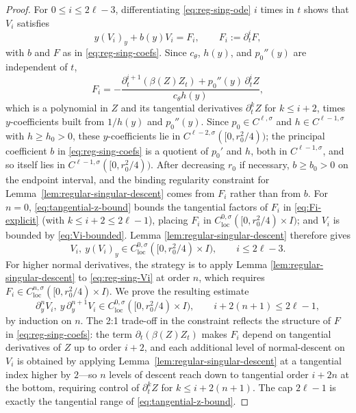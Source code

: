 \documentclass[10pt,a4paper]{amsart}
\newcommand{\loc}{\mathrm{loc}}
\begin{document}
\begin{proof}
For \(0\le i\le2\ell-3\), differentiating \eqref{eq:reg-sing-ode} \(i\)
times in \(t\) shows that \(V_i\) satisfies
\begin{equation}
\label{eq:reg-sing-Vi}
        y(V_i)_y+b(y)V_i=F_i,
        \qquad F_i:=\partial_t^iF,
\end{equation}
with \(b\) and \(F\) as in \eqref{eq:reg-sing-coefs}. Since
\(c_\theta\), \(h(y)\), and \(p_0''(y)\) are independent of \(t\),
\begin{equation}
\label{eq:Fi-explicit}
        F_i=-\frac{\partial_t^{i+1}(\beta(Z)Z_t)
        +p_0''(y)\,\partial_t^iZ}{c_\theta h(y)} ,
\end{equation}
which is a polynomial in \(Z\) and its tangential derivatives
\(\partial_t^kZ\) for \(k\le i+2\), times \(y\)-coefficients built from
\(1/h(y)\) and \(p_0''(y)\). Since \(p_0\in C^{\ell,\sigma}\) and
\(h\in C^{\ell-1,\sigma}\) with \(h\ge h_0>0\), these \(y\)-coefficients
lie in \(C^{\ell-2,\sigma}([0,r_0^2/4))\); the principal coefficient
\(b\) in \eqref{eq:reg-sing-coefs} is a quotient of \(p_0'\) and \(h\), both
in \(C^{\ell-1,\sigma}\), and so itself lies in
\(C^{\ell-1,\sigma}([0,r_0^2/4))\). After decreasing \(r_0\) if
necessary, \(b\ge b_0>0\) on the endpoint interval, and the binding
regularity constraint for
Lemma~\ref{lem:regular-singular-descent} comes from \(F_i\) rather than
from \(b\).
For \(n=0\), \eqref{eq:tangential-z-bound} bounds the tangential factors
of \(F_i\) in \eqref{eq:Fi-explicit} (with \(k\le i+2\le2\ell-1\)),
placing \(F_i\) in \(C^{0,\sigma}_{\loc}([0,r_0^2/4)\times I)\); and
\(V_i\) is bounded by \eqref{eq:Vi-bounded}. Lemma
\ref{lem:regular-singular-descent} therefore gives
\begin{equation}
\label{eq:Vi-base}
        V_i,\ y(V_i)_y\in C^{0,\sigma}_{\loc}([0,r_0^2/4)\times I),
        \qquad i\le2\ell-3 .
\end{equation}
For higher normal derivatives, the strategy is to apply Lemma
\ref{lem:regular-singular-descent} to \eqref{eq:reg-sing-Vi} at order
\(n\), which requires \(F_i\in C^{n,\sigma}_{\loc}([0,r_0^2/4)\times I)\).
We prove the resulting estimate
\begin{equation}
\label{eq:Vi-n-form}
        \partial_y^nV_i,\ y\,\partial_y^{n+1}V_i
        \in C^{0,\sigma}_{\loc}([0,r_0^2/4)\times I),
        \qquad i+2(n+1)\le2\ell-1,
\end{equation}
by induction on \(n\). The 2:1 trade-off in the constraint reflects the
structure of \(F\) in \eqref{eq:reg-sing-coefs}: the term
\(\partial_t(\beta(Z)Z_t)\) makes \(F_i\) depend on tangential derivatives
of \(Z\) up to order \(i+2\), and each additional level of normal-descent
on \(V_i\) is obtained by applying
Lemma~\ref{lem:regular-singular-descent} at a tangential index higher by
\(2\)---so \(n\) levels of descent reach down to tangential order
\(i+2n\) at the bottom, requiring control of \(\partial_t^kZ\) for
\(k\le i+2(n+1)\). The cap \(2\ell-1\) is exactly the
tangential range of \eqref{eq:tangential-z-bound}.


\end{proof}
\end{document}
